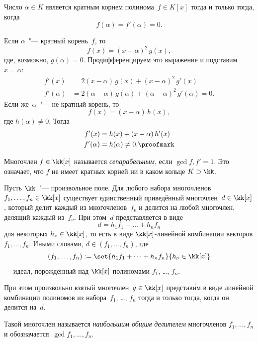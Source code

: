 \begin{lemma}
	Число $\alpha \in K$ является кратным корнем полинома~$f \in K[x]$ тогда и только тогда, когда
	\[
		f(\alpha) =
		f'(\alpha) =
		0
		.
	\]
\end{lemma}
\begin{proofm}
	Если $\alpha$~"--- кратный корень~$f$, то
	\[
		f(x) = (x - \alpha)^2\,g(x),
	\]
	где, возможно, $g(\alpha) = 0$. Продифференцируем это выражение и подставим~$x = \alpha$:
	\begin{align*}
		f'(x) &= 2(x - \alpha)\,g(x) + (x - \alpha)^2\,g'(x)
		\\
		f'(\alpha) &= 2(\alpha - \alpha)\,g(\alpha) + (\alpha - \alpha)^2\,g'(\alpha) = 0
		.
	\end{align*}
	Если же~$\alpha$~"--- не кратный корень, то
	\[
		f(x) = (x - \alpha)\,h(x),
	\]
	где $h(\alpha) \neq 0$. Тогда
	\begin{align*}
		f'(x) &= h(x) + (x - \alpha)\,h'(x)
		\\
		f'(\alpha) &= h(\alpha) \neq 0.
		\proofmark
	\end{align*}
\end{proofm}

\begin{definition}
	Многочлен $f \in \kk[x]$ называется \emph{сепарабельным}, если $\gcd{f, f'} = 1$. Это означает, что $f$ не имеет кратных корней ни в каком кольце $K \supset \kk$.
	\label{<+label+>}
\end{definition}

\begin{lemma}
	Пусть $\kk$~"--- произвольное поле. Для любого набора многочленов $f_1, \dots, f_n \in \kk[x]$ существует единственный приведённый многочлен~$d \in \kk[x]$, который делит каждый из многочленов~$f_\nu$ и делится на любой многочлен, делящий каждый из~$f_\nu$. При этом~$d$ представляется в виде
	\[
		d = h_1 f_1 + \dots + h_n f_n
	\]
	для некоторых $h_\nu \in \kk[x]$, то есть в виде $\kk[x]$-линейной комбинации векторов $f_1, \dots, f_n$. Иными словами, $d \in (f_1, \dots, f_n)$, где
	\[
		(f_1, \dots, f_n) :=
		\set{
			h_1 f_1 + \dots + h_n f_n
		}{h_\nu \in \kk[x]}
	\]
	--- идеал, порождённый над $\kk[x]$ полиномами $f_1$, \dots, $f_n$.
	
	При этом произвольно взятый многочлен~$g \in \kk[x]$ представ\'{и}м в виде линейной комбинации полиномов из набора~$f_1$, \dots, $f_n$ тогда и только тогда, когда он делится на~$d$.
	\label{<+label+>}
\end{lemma}

Такой многочлен называется \emph{наибольшим общим делителем} многочленов $f_1, \dots, f_n$ и обозначается~$\gcd{f_1, \dots, f_n}$.



